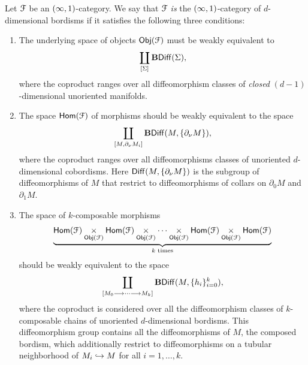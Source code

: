 \begin{definition}
Let $\mathcal F$ be an $(\operatorname{\infty},1)$-category. We say that $\mathcal F$ \emph{is} the $(\operatorname{\infty},1)$-category of $d$-dimensional bordisms if it satisfies the following three conditions:
\begin{enumerate}
    \item \label{ch3:: cond: bordism cat objects} The underlying space of objects $\operatorname{\mathsf{Obj}}(\mathcal F)$ must be weakly equivalent to 
    \begin{equation}
        \coprod_{[\Sigma]}\mathbf{B}\!\operatorname{{\sf Diff}}(\Sigma),
    \end{equation}
    where the coproduct ranges over all diffeomorphism classes of \emph{closed} $(d-1)$-dimensional unoriented manifolds.  
    \item \label{ch3:: cond: bordism cat morphisms} The space $\operatorname{\sf Hom}(\mathcal F)$ of morphisms should be weakly equivalent to the space 
    \begin{equation}
        \coprod_{[M,\partial_{\nu}M_i]}\mathbf{B}\!\operatorname{{\sf Diff}}(M,\{\partial_{\nu}M\}),
    \end{equation} 
    where the coproduct ranges over all diffeomorphisms classes of unoriented $d$-dimensional cobordisms. Here $\operatorname{{\sf Diff}}(M,\{\partial_\nu M\})$ is the subgroup of diffeomorphisms of $M$ that restrict to diffeomorphisms of collars on $\partial_0 M$ and $\partial_1 M$. 
    \item \label{ch3:: cond: bordism cat composable} The space of $k$-composable morphisms
    \begin{equation}
        \underbrace{ \operatorname{\sf Hom}(\mathcal F) \underset{\operatorname{\mathsf{Obj}}(\mathcal F)}{\times} \operatorname{\sf Hom}(\mathcal F) \underset{\operatorname{\mathsf{Obj}}(\mathcal F)}{\times} \cdots \underset{\operatorname{\mathsf{Obj}}(\mathcal F)}{\times} \operatorname{\sf Hom}(\mathcal F) \underset{\operatorname{\mathsf{Obj}}(\mathcal F)}{\times} \operatorname{\sf Hom}(\mathcal F) }_{k \text{ times}}
    \end{equation} 
    should be weakly equivalent to the space 
    \begin{equation}
         \coprod_{[M_0 \longrightarrow \cdots \longrightarrow M_k]}\mathbf{B}\!\operatorname{{\sf Diff}}(M,\{h_i\}_{i=0}^{k}),
    \end{equation}
    where the coproduct is considered over all the diffeomorphism classes of $k$-composable chains of unoriented $d$-dimensional bordisms. This diffeomorphism group contains all the diffeomorphisms of $M$, the composed bordism, which additionally restrict to diffeomorphisms on a tubular neighborhood of $M_i \hookrightarrow M$ for all $i=1,\ldots,k$.
\end{enumerate}

\end{definition}

